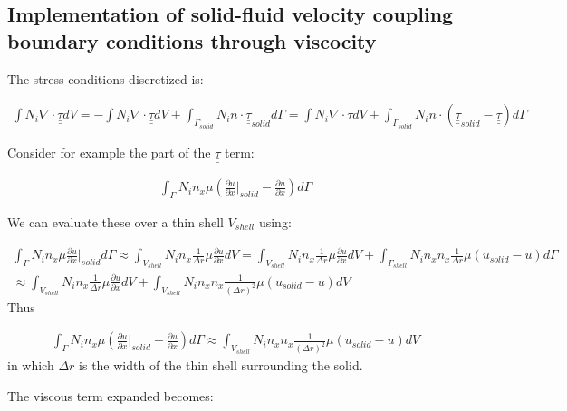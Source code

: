 \subsection{Implementation of solid-fluid velocity coupling boundary conditions through viscocity}


The stress conditions discretized is: 

\begin{eqnarray}
\int N_i \nabla \cdot \underline{\underline{\tau}} dV = 
-
\int N_i \nabla \cdot \underline{\underline{\tau}} dV 
+ \int_{\Gamma_{solid}} N_i n\cdot \underline{\underline{\tau}}_{solid} d\Gamma
=\int N_i \nabla \cdot \tau dV
+ \int_{\Gamma_{solid}} N_i n\cdot (\underline{\underline{\tau}}_{solid} - \underline{\underline{\tau}}) d\Gamma
\label{visc-stress-original} 
\end{eqnarray} 

Consider for example the part of the $\underline{\underline{\tau}}$ term: 

\begin{eqnarray}
\int_\Gamma N_i n_x \mu ( \frac{\partial u}{\partial x}\vert_{solid} - \frac{\partial u}{\partial x} ) d\Gamma
\label{visc-stress-original-solid-bc} 
\end{eqnarray} 

We can evaluate these over a thin shell $V_{shell}$ using: 

\begin{eqnarray}
\int_\Gamma  N_i n_x \mu \frac{\partial u}{\partial x} \vert_{solid} d\Gamma
\approx 
\int_{V_{shell}}  N_i n_x \frac{1}{\Delta r} \mu \frac{\partial u}{\partial x}  dV
=
\int_{V_{shell}}  N_i n_x \frac{1}{\Delta r}\mu \frac{\partial u}{\partial x}  dV
+
\int_{\Gamma_{shell}}  N_i n_x n_x \frac{1}{\Delta r}\mu (u_{solid} -u)  d\Gamma
\\
\approx
\int_{V_{shell}}  N_i n_x \frac{1}{\Delta r}\mu \frac{\partial u}{\partial x}  dV
+
\int_{V_{shell}}  N_i n_x n_x \frac{1}{(\Delta r)^2}\mu (u_{solid} -u)  dV
\label{visc-stress-original-practical} 
\end{eqnarray} 
Thus

\begin{eqnarray}
\int_\Gamma N_i n_x \mu ( \frac{\partial u}{\partial x}\vert_{solid} - \frac{\partial u}{\partial x} ) d\Gamma
\approx
\int_{V_{shell}}  N_i n_x n_x \frac{1}{(\Delta r)^2}\mu (u_{solid} -u)  dV
\end{eqnarray} 
in which $\Delta r$ is the width of the thin shell surrounding the solid. 


The viscous term expanded becomes:

